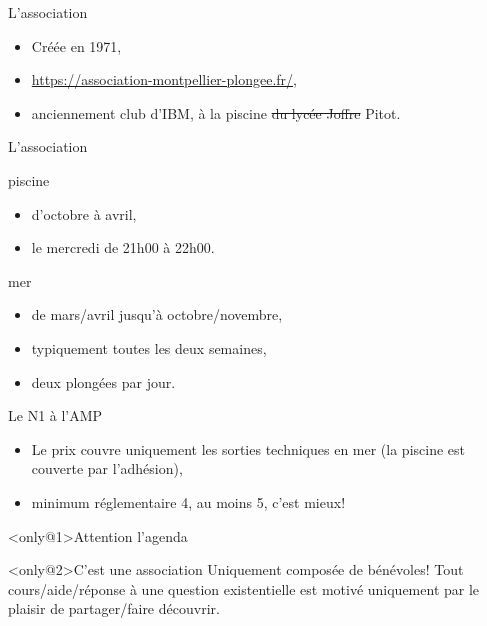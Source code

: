 \begin{frame}{L'association}
\begin{itemize}
\item Créée en 1971,
\item \url{https://association-montpellier-plongee.fr/},
\item anciennement club d'IBM, à la piscine \st{du lycée Joffre} Pitot.
\end{itemize}
\end{frame}

\begin{frame}{L'association}
\begin{block}{piscine}
\begin{itemize}
\item d'octobre à avril, 
\item le mercredi de 21h00 à 22h00.
\end{itemize}
\end{block}
\begin{block}{mer}
\begin{itemize}
\item de mars/avril jusqu'à octobre/novembre,
\item typiquement toutes les deux semaines,
\item deux plongées par jour.
\end{itemize}
\end{block}
\end{frame}

\begin{frame}{Le N1 à l'AMP}
\begin{itemize}
\item Le prix couvre uniquement les sorties techniques en mer
  (la piscine est couverte par l'adhésion),
\item minimum réglementaire 4, au moins 5, c'est mieux!
\end{itemize}

\begin{alertblock}<only@1>{Attention l'agenda}
\end{alertblock}

\begin{exampleblock}<only@2>{C'est une association}
Uniquement composée de bénévoles! Tout cours/aide/réponse à une question
existentielle est motivé uniquement par le plaisir de partager/faire découvrir.
\end{exampleblock}

\end{frame}
